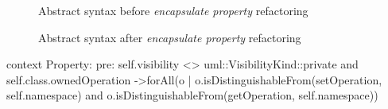 \documentclass{llncs}
\begin{document}
\begin{figure}
 \caption{Abstract syntax before \textit{encapsulate property} refactoring}
 \label{fig:encapsulatebefore}
\end{figure}

\begin{figure}
 \caption{Abstract syntax after \textit{encapsulate property} refactoring}
 \label{fig:encapsulateafter}
\end{figure}


\begin{lstsingle}[language=OCL,caption=OCL for encapsulate property,label=lst:encapsulateproperty]
context Property:
pre:  self.visibility <> uml::VisibilityKind::private and
      self.class.ownedOperation
      ->forAll(o | o.isDistinguishableFrom(setOperation,
              self.namespace) and
      o.isDistinguishableFrom(getOperation, self.namespace))
\end{lstsingle}

\end{document}

